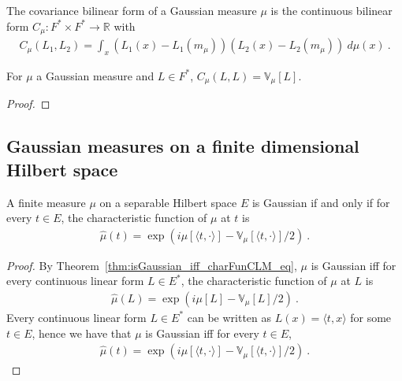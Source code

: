 \begin{definition}[Covariance]\label{def:covarianceBilin}
The covariance bilinear form of a Gaussian measure $\mu$ is the continuous bilinear form $C_\mu : F^* \times F^* \to \mathbb{R}$ with
\begin{align*}
  C_\mu(L_1, L_2) = \int_x (L_1(x) - L_1(m_\mu)) (L_2(x) - L_2(m_\mu)) \: d\mu(x) \: .
\end{align*}
\end{definition}


\begin{lemma}\label{lem:covarianceBilin_same_eq_variance}
For $\mu$ a Gaussian measure and $L \in F^*$, $C_\mu(L, L) = \mathbb{V}_\mu[L]$.
\end{lemma}

\begin{proof}

\end{proof}


\subsection{Gaussian measures on a finite dimensional Hilbert space}

\begin{lemma}\label{lem:isGaussian_iff_charFunCLM_inner_eq}
A finite measure $\mu$ on a separable Hilbert space $E$ is Gaussian if and only if for every $t \in E$, the characteristic function of $\mu$ at $t$ is
\begin{align*}
  \hat{\mu}(t) =  \exp\left(i \mu[\langle t, \cdot \rangle] - \mathbb{V}_\mu[\langle t, \cdot \rangle] / 2\right) \: .
\end{align*}
\end{lemma}

\begin{proof}
By Theorem~\ref{thm:isGaussian_iff_charFunCLM_eq}, $\mu$ is Gaussian iff for every continuous linear form $L \in E^*$, the characteristic function of $\mu$ at $L$ is
\begin{align*}
  \hat{\mu}(L) = \exp\left(i \mu[L] - \mathbb{V}_\mu[L] / 2\right) \: .
\end{align*}
Every continuous linear form $L \in E^*$ can be written as $L(x) = \langle t, x \rangle$ for some $t \in E$, hence we have that $\mu$ is Gaussian iff for every $t \in E$,
\begin{align*}
  \hat{\mu}(t) = \exp\left(i \mu[\langle t, \cdot \rangle] - \mathbb{V}_\mu[\langle t, \cdot \rangle] / 2\right) \: .
\end{align*}
\end{proof}

